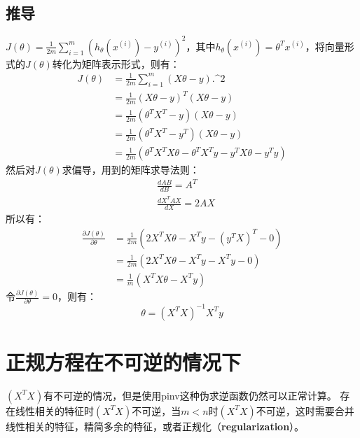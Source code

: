 \documentclass[../main.tex]{subfiles}
\begin{document}
\subsection{推导}
\(J(θ)=\frac{1}{2m}\sum\limits_{i=1}^{m}(h_θ(x^{(i)})-y^{(i)})^2\)，其中\(h_θ(x^{(i)})=θ^Tx^{(i)}\)，将向量形式的\(J(θ)\)转化为矩阵表示形式，则有：
\begin{align*}
    J(θ) & =\frac{1}{2m}\sum\limits_{i=1}^{m}(Xθ-y).\^{}2    \\
         & =\frac{1}{2m}(Xθ-y)^T(Xθ-y)                      \\
         & =\frac{1}{2m}(θ^TX^T-y)(Xθ-y)                    \\
         & =\frac{1}{2m}(θ^TX^T-y^T)(Xθ-y)                  \\
         & =\frac{1}{2m}(θ^TX^TXθ - θ^TX^Ty - y^TXθ - y^Ty)
\end{align*}
然后对\(J(θ)\)求偏导，用到的矩阵求导法则：
\begin{align*}
     & \frac{dAB}{dB}=A^T    \\
     & \frac{dX^TAX}{dX}=2AX
\end{align*}
所以有：
\begin{align*}
    \frac{∂J(θ)}{∂θ} & =\frac{1}{2m}(2X^TXθ - X^Ty - (y^TX)^T - 0) \\
                     & =\frac{1}{2m}(2X^TXθ - X^Ty - X^Ty - 0)     \\
                     & =\frac{1}{m}(X^TXθ - X^Ty)
\end{align*}
令\(\frac{∂J(θ)}{∂θ}=0\)，则有：\[θ=(X^TX)^{-1}X^Ty\]

\section{正规方程在不可逆的情况下}
\((X^TX)\)有不可逆的情况，但是使用pinv这种伪求逆函数仍然可以正常计算。
存在线性相关的特征时\((X^TX)\)不可逆，当\(m<n\)时\((X^TX)\)不可逆，这时需要合并线性相关的特征，精简多余的特征，或者正规化（\textbf{regularization}）。
\end{document}
